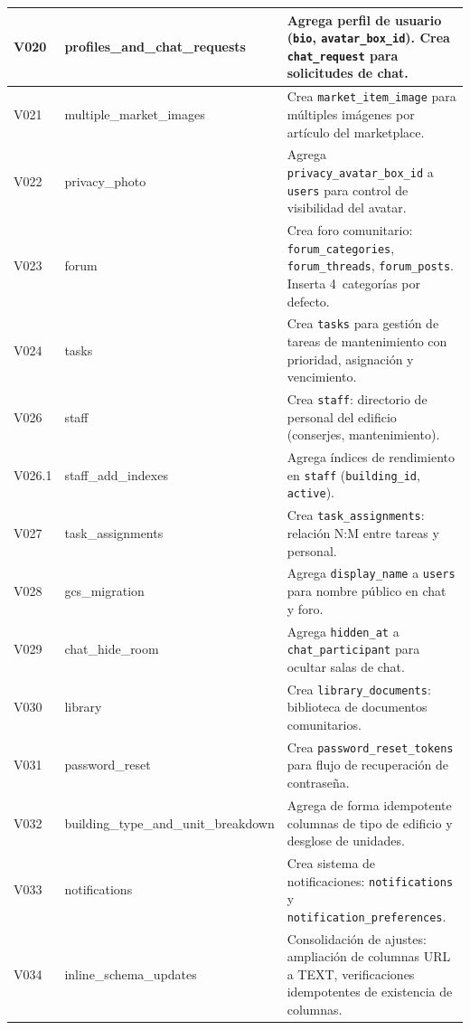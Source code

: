 \begin{longtable}{|p{}|p{}|p{}|}
V020 & profiles\_and\_chat\_requests & Agrega perfil de usuario (\texttt{bio}, \texttt{avatar\_box\_id}). Crea \texttt{chat\_request} para solicitudes de chat. \\ \hline

V021 & multiple\_market\_images & Crea \texttt{market\_item\_image} para múltiples imágenes por artículo del marketplace. \\ \hline

V022 & privacy\_photo & Agrega \texttt{privacy\_avatar\_box\_id} a \texttt{users} para control de visibilidad del avatar. \\ \hline

V023 & forum & Crea foro comunitario: \texttt{forum\_categories}, \texttt{forum\_threads}, \texttt{forum\_posts}. Inserta 4~categorías por defecto. \\ \hline

V024 & tasks & Crea \texttt{tasks} para gestión de tareas de mantenimiento con prioridad, asignación y vencimiento. \\ \hline

V026 & staff & Crea \texttt{staff}: directorio de personal del edificio (conserjes, mantenimiento). \\ \hline

V026.1 & staff\_add\_indexes & Agrega índices de rendimiento en \texttt{staff} (\texttt{building\_id}, \texttt{active}). \\ \hline

V027 & task\_assignments & Crea \texttt{task\_assignments}: relación N:M entre tareas y personal. \\ \hline

V028 & gcs\_migration & Agrega \texttt{display\_name} a \texttt{users} para nombre público en chat y foro. \\ \hline

V029 & chat\_hide\_room & Agrega \texttt{hidden\_at} a \texttt{chat\_participant} para ocultar salas de chat. \\ \hline

V030 & library & Crea \texttt{library\_documents}: biblioteca de documentos comunitarios. \\ \hline

V031 & password\_reset & Crea \texttt{password\_reset\_tokens} para flujo de recuperación de contraseña. \\ \hline

V032 & building\_type\_and\_unit\_breakdown & Agrega de forma idempotente columnas de tipo de edificio y desglose de unidades. \\ \hline

V033 & notifications & Crea sistema de notificaciones: \texttt{notifications} y \texttt{notification\_preferences}. \\ \hline

V034 & inline\_schema\_updates & Consolidación de ajustes: ampliación de columnas URL a TEXT, verificaciones idempotentes de existencia de columnas. \\ \hline


\end{longtable}

